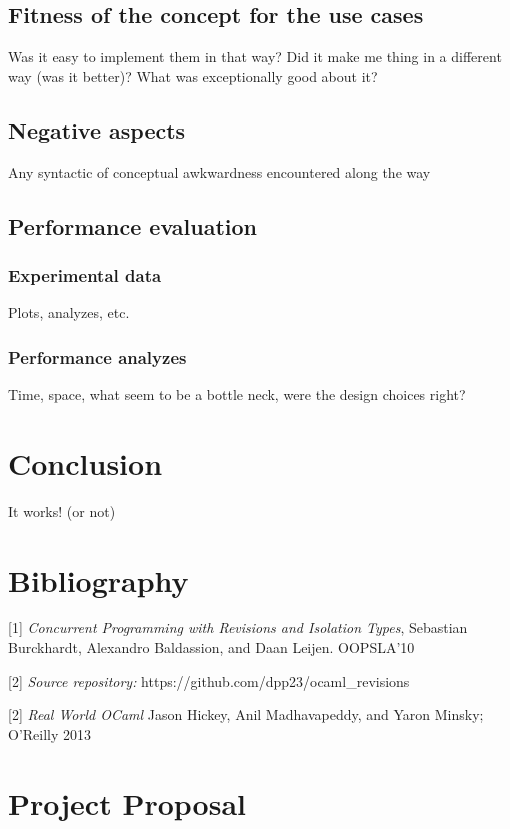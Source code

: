 \documentclass[12pt,twoside,notitlepage]{report}
\begin{document}
\section{Fitness of the concept for the use cases}
Was it easy to implement them in that way? Did it make me thing in a different way (was it better)? What was exceptionally good about it?

\section{Negative aspects}
Any syntactic of conceptual awkwardness encountered along the way

\section{Performance evaluation}
\subsection{Experimental data}
Plots, analyzes, etc.

\subsection{Performance analyzes}
Time, space, what seem to be a bottle neck, were the design choices right? 




\cleardoublepage
\chapter{Conclusion}

It works! (or not)




\cleardoublepage



\cleardoublepage
\chapter{Bibliography}
\begin{description}
\item{[1]} \emph{Concurrent Programming with Revisions and Isolation Types}, Sebastian Burckhardt, Alexandro Baldassion, and Daan Leijen. OOPSLA'10
\item{[2]} \emph{Source repository:} https://github.com/dpp23/ocaml\_revisions
\item{[2]} \emph{Real World OCaml} Jason Hickey, Anil Madhavapeddy, and Yaron Minsky; O'Reilly 2013
\end{description}

\appendix


\chapter{Project Proposal}

%
\end{document}
